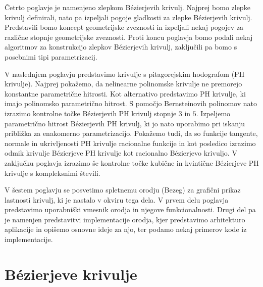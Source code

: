 \documentclass[isrm2, tisk]{fmfdelo}
\begin{document}
    Četrto poglavje je namenjeno zlepkom Bézierjevih krivulj.
    Najprej bomo zlepke krivulj definirali, nato pa izpeljali pogoje gladkosti za zlepke Bézierjevih krivulj.
    Predstavili bomo koncept geometrijske zveznosti in izpeljali nekaj pogojev za različne stopnje geometrijske zveznosti.
    Proti koncu poglavja bomo podali nekaj algoritmov za konstrukcijo zlepkov Bézierjevih krivulj, zaključili pa bomo s posebnimi tipi parametrizacij.

    V naslednjem poglavju predstavimo krivulje s pitagorejskim hodografom (PH krivulje).
    Najprej pokažemo, da nelinearne polinomske krivulje ne premorejo konstantne parametrične hitrosti.
    Kot alternativo predstavimo PH krivulje, ki imajo polinomsko parametrično hitrost.
    S pomočjo Bernsteinovih polinomov nato izrazimo kontrolne točke Bézierjevih PH krivulj stopnje $3$ in $5$.
    Izpeljemo parametrično hitrost Bézierjevih PH krivulj, ki jo nato uporabimo pri iskanju približka za enakomerno parametrizacijo.
    Pokažemo tudi, da so funkcije tangente, normale in ukrivljenosti PH krivulje racionalne funkcije in kot posledico izrazimo odmik krivulje Bézierjeve PH krivulje kot racionalno Bézierjevo krivuljo.
    V zaključku poglavja izrazimo še kontrolne točke kubične in kvintične Bézierjeve PH krivulje s kompleksnimi števili.

    V šestem poglavju se posvetimo spletnemu orodju (Bezeg) za grafični prikaz lastnosti krivulj, ki je nastalo v okviru tega dela.
    V prvem delu poglavja predstavimo uporabniški vmesnik orodja in njegove funkcionalnosti.
    Drugi del pa je namenjen predstavitvi implementacije orodja, kjer predstavimo arhitekturo aplikacije in opišemo osnovne ideje za njo, ter podamo nekaj primerov kode iz implementacije.


    \section{Bézierjeve krivulje}\label{sec:bezierjeve-krivulje}
\end{document}
